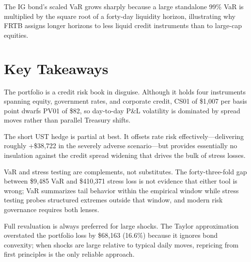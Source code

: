 \documentclass[11pt, a4paper]{article}
\begin{document}
The IG bond's scaled VaR grows sharply because a large standalone 99\% VaR is multiplied by the square root of a forty-day liquidity horizon, illustrating why FRTB assigns longer horizons to less liquid credit instruments than to large-cap equities.

\section{Key Takeaways}

The portfolio is a credit risk book in disguise. Although it holds four instruments spanning equity, government rates, and corporate credit, CS01 of \$1,007 per basis point dwarfs PV01 of \$82, so day-to-day P\&L volatility is dominated by spread moves rather than parallel Treasury shifts.

The short UST hedge is partial at best. It offsets rate risk effectively---delivering roughly +\$38,722 in the severely adverse scenario---but provides essentially no insulation against the credit spread widening that drives the bulk of stress losses.

VaR and stress testing are complements, not substitutes. The forty-three-fold gap between \$9,485 VaR and \$410,371 stress loss is not evidence that either tool is wrong; VaR summarizes tail behavior within the empirical window while stress testing probes structured extremes outside that window, and modern risk governance requires both lenses.

Full revaluation is always preferred for large shocks. The Taylor approximation overstated the portfolio loss by \$68,163 (16.6\%) because it ignores bond convexity; when shocks are large relative to typical daily moves, repricing from first principles is the only reliable approach.
\end{document}
